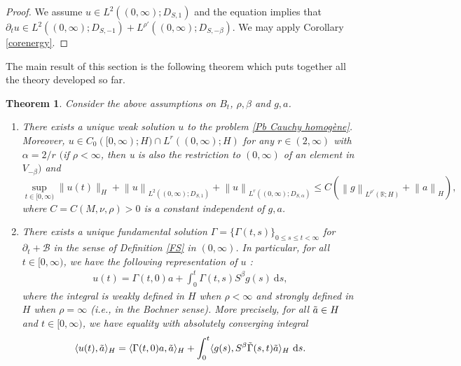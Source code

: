 \documentclass[11pt, letterpaper]{amsart}
\newtheorem{thm}{Theorem}[section]
\theoremstyle{definition}
\theoremstyle{remark}
\numberwithin{equation}{section}
\begin{document}
    \begin{proof}
        We assume $u \in L^2((0,\infty); D_{S,1})$ and the equation implies that $\partial_tu \in L^2((0,\infty); D_{S,-1})+ L^{\rho'}((0,\infty);D_{S,-\beta}).$
        We may apply  Corollary \ref{corenergy}.
    \end{proof}




The main result of this section is the following theorem which puts together all the theory developed so far. 

\begin{thm}\label{ThmCauchy homog} Consider the above assumptions on $B_t$, $\rho, \beta$ and $g, a$.
\begin{enumerate}
   \item There exists a unique weak solution $u$ to the problem \eqref{Pb Cauchy homogène}. Moreover, 
    $u \in C_0([0,\infty);H)\cap L^r((0,\infty);H)$ for any $r \in (2,\infty)$ with $\alpha={2}/{r}$ $($if  $\rho<\infty$, then u is also the restriction to $(0,\infty)$ of an element in $V_{-\beta})$
        and
        $$ \sup_{t\in [0,\infty)} \| u(t)  \|_{H}+\left \| u \right \|_{L^2((0,\infty);D_{S,1})}+\left \| u \right \|_{L^r((0,\infty);D_{S,\alpha})} \leq C \left (  
        \left \| g \right \|_{L^{\rho'}(\mathbb{R};H)}+ \left \| a \right \|_H \right ),$$
where $C=C(M,\nu, \rho)>0$ is a constant independent of $g, a$.
        \item There exists a unique fundamental solution $\Gamma=\{\Gamma(t,s)\}_{0\leq s \leq t <\infty}$ for $\partial_t+\mathcal{B}$ in the sense of Definition \ref{FS} in $(0,\infty)$. In particular, for all $t \in [0,\infty)$, we have the following representation of $u$ :   
        \begin{align}\label{eq:repCauchy0infty}
            u(t)=\Gamma(t,0)a+ \int_{0}^{t} \Gamma(t,s)S^\beta g(s)\ \mathrm ds, 
        \end{align}
         where the integral is weakly defined in $H$ when $\rho<\infty$ and strongly defined in $H$ when $\rho=\infty$ (i.e.,  in the Bochner sense). More precisely, for all $\Tilde{a} \in H$ and $t \in [0,\infty)$, we have equality with  absolutely converging integral
        \begin{align}\label{faible}
            \langle u(t) , \Tilde{a}\rangle_H = \langle \Gamma(t,0)a , \Tilde{a}\rangle_H 
            + \int_{0}^{t} \langle g(s) , S^\beta \Tilde{\Gamma}(s,t)\Tilde{a}\rangle_{H}\  \mathrm ds. 
        \end{align} 
    \end{enumerate}
\end{thm}
\end{document}
